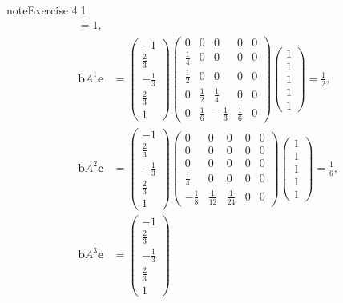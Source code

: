\documentclass[letterpaper,10pt,english]{jupyterBook}
\begin{document}
\begin{sphinxadmonition}{note}{Exercise 4.1}
\begin{align*}
    = 1, \\
    \mathbf{b} A^1 \mathbf{e} &= 
    \begin{pmatrix} -1 \\ \frac{2}{3} \\ -\frac{1}{3} \\ \frac{2}{3} \\ 1 \end{pmatrix}
    \begin{pmatrix} 
        0 & 0 & 0 & 0 & 0 \\
        \frac{1}{4} & 0 & 0 & 0 & 0 \\
        \frac{1}{2} & 0 & 0 & 0 & 0 \\
        0 & \frac{1}{2} & \frac{1}{4} & 0 & 0 \\
        0 & \frac{1}{6} & -\frac{1}{3} & \frac{1}{6} & 0
    \end{pmatrix}
    \begin{pmatrix} 1 \\ 1 \\ 1 \\ 1 \\ 1 \end{pmatrix}
    = \frac{1}{2}, \\
    \mathbf{b} A^2 \mathbf{e} &= 
    \begin{pmatrix} -1 \\ \frac{2}{3} \\ -\frac{1}{3} \\ \frac{2}{3} \\ 1 \end{pmatrix}
    \begin{pmatrix} 
        0 & 0 & 0 & 0 & 0 \\
        0 & 0 & 0 & 0 & 0 \\
        0 & 0 & 0 & 0 & 0 \\
        \frac{1}{4} & 0 & 0 & 0 & 0 \\
        -\frac{1}{8} & \frac{1}{12} & \frac{1}{24} & 0 & 0
    \end{pmatrix}
    \begin{pmatrix} 1 \\ 1 \\ 1 \\ 1 \\ 1 \end{pmatrix}
    = \frac{1}{6}, \\
    \mathbf{b} A^3 \mathbf{e} &= 
    \begin{pmatrix} -1 \\ \frac{2}{3} \\ -\frac{1}{3} \\ \frac{2}{3} \\ 1 \end{pmatrix}

\end{align*}
\end{sphinxadmonition}
\end{document}
